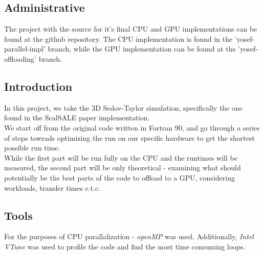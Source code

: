 \subsection*{Administrative}
The project with the source for it's final CPU and GPU implementations can be found at the github \cite{this_repo}
repository. The CPU implementation is found in the 'yosef-parallel-impl' branch,
while the GPU implementation can be found at the 'yosef-offloading' branch.

\subsection*{Introduction}
In this project, we take the 3D Sedov-Taylor simulation, specifically the
one found in the ScalSALE\cite{scalsale} paper implementation.\\
We start off from the original code written in Fortran 90, 
and go through a series of steps towrads optimizing the run on our specific
hardware to get the shortest possible run time.\\
While the first part will be run fully on the CPU and the runtimes will be measured,
the second part will be only theoretical - examining what should potentially
be the best parts of the code to offload to a GPU, considering workloads,
transfer times e.t.c.\\

\subsection*{Tools}
For the purposes of CPU parallalization - \emph{openMP} was used.
Additionally, \emph{Intel VTune} was used to profile the code and
find the most time consuming loops.
